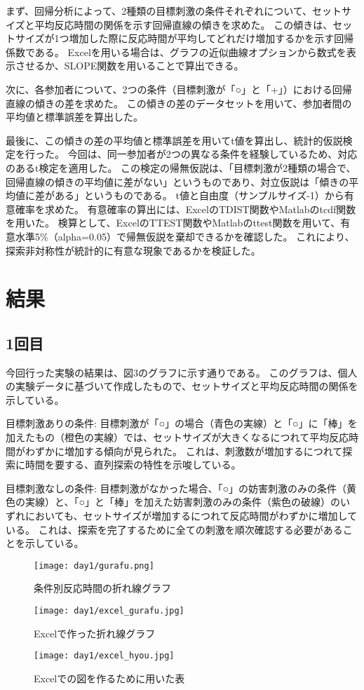 \documentclass{jlreq}
\begin{document}
まず、回帰分析によって、2種類の目標刺激の条件それぞれについて、セットサイズと平均反応時間の関係を示す回帰直線の傾きを求めた。
この傾きは、セットサイズが1つ増加した際に反応時間が平均してどれだけ増加するかを示す回帰係数である。
Excelを用いる場合は、グラフの近似曲線オプションから数式を表示させるか、SLOPE関数を用いることで算出できる。


次に、各参加者について、2つの条件（目標刺激が「○」と「+」）における回帰直線の傾きの差を求めた。
この傾きの差のデータセットを用いて、参加者間の平均値と標準誤差を算出した。

最後に、この傾きの差の平均値と標準誤差を用いてt値を算出し、統計的仮説検定を行った。
今回は、同一参加者が2つの異なる条件を経験しているため、対応のあるt検定を適用した。
この検定の帰無仮説は、「目標刺激が2種類の場合で、回帰直線の傾きの平均値に差がない」というものであり、対立仮説は「傾きの平均値に差がある」というものである。
t値と自由度（サンプルサイズ-1）から有意確率を求めた。
有意確率の算出には、ExcelのTDIST関数やMatlabのtcdf関数を用いた。
検算として、ExcelのTTEST関数やMatlabのttest関数を用いて、有意水準5\%（alpha=0.05）で帰無仮説を棄却できるかを確認した。
これにより、探索非対称性が統計的に有意な現象であるかを検証した。
\section{結果}
\subsection{1回目}
今回行った実験の結果は、図3のグラフに示す通りである。
このグラフは、個人の実験データに基づいて作成したもので、セットサイズと平均反応時間の関係を示している。

目標刺激ありの条件: 目標刺激が「○」の場合（青色の実線）と「○」に「棒」を加えたもの（橙色の実線）では、セットサイズが大きくなるにつれて平均反応時間がわずかに増加する傾向が見られた。
これは、刺激数が増加するにつれて探索に時間を要する、直列探索の特性を示唆している。

目標刺激なしの条件: 目標刺激がなかった場合、「○」の妨害刺激のみの条件（黄色の実線）と、「○」と「棒」を加えた妨害刺激のみの条件（紫色の破線）のいずれにおいても、セットサイズが増加するにつれて反応時間がわずかに増加している。
これは、探索を完了するために全ての刺激を順次確認する必要があることを示している。

\begin{figure}[H]
    \centering
    \texttt{[image: day1/gurafu.png]}
    \caption{条件別反応時間の折れ線グラフ}
    \label{fig:kadai1}
\end{figure}
\begin{figure}[H]
    \centering
    \texttt{[image: day1/excel\_gurafu.jpg]}
    \caption{Excelで作った折れ線グラフ}
    \label{fig:kadai1}
\end{figure}
\begin{figure}[H]
    \centering
    \texttt{[image: day1/excel\_hyou.jpg]}
    \caption{Excelでの図を作るために用いた表}
    \label{fig:kadai1}
\end{figure}
\end{document}
